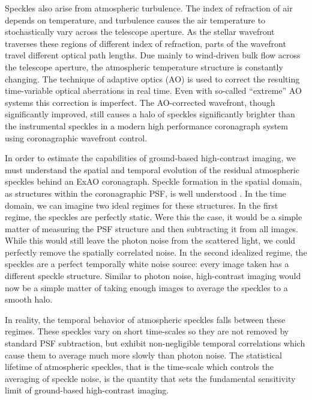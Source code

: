 \documentclass[10pt,preprint]{aastex631}
\begin{document}
Speckles also arise from atmospheric turbulence.  The index of refraction of air depends on temperature, and turbulence causes the air temperature to stochastically vary across the telescope aperture.  As the stellar wavefront traverses these regions of different index of refraction, parts of the wavefront travel different optical path lengths.  Due mainly to wind-driven bulk flow across the telescope aperture, the atmospheric temperature structure is constantly changing.  The technique of adaptive optics (AO) is used to correct the resulting time-variable optical aberrations in real time.  Even with so-called ``extreme'' AO systems \citep[ExAO, ][]{2018ARAA..56..315G} this correction is imperfect.  The AO-corrected wavefront, though significantly improved, still causes a halo of speckles significantly brighter than the instrumental speckles in a modern high performance coronagraph system using coronagraphic wavefront control.

In order to estimate the capabilities of ground-based high-contrast imaging, we must understand the spatial and temporal evolution of the residual atmospheric speckles behind an ExAO coronagraph.  Speckle formation in the spatial domain, as structures within the coronagraphic PSF, is well understood \citep{2001ApJ...558L..71B,2003ApJ...596..702P,2007ApJ...669..642S}.  In the time domain, we can imagine two ideal regimes for these structures.  In the first regime, the speckles are perfectly static.  Were this the case, it would be a simple matter of measuring the PSF structure and then subtracting it from all images.  While this would still leave the photon noise from the scattered light, we could perfectly remove the spatially correlated noise.  In the second idealized regime, the speckles are a perfect temporally white noise source: every image taken has a different speckle structure.  Similar to photon noise, high-contrast imaging would now be a simple matter of taking enough images to average the speckles to a smooth halo.

In reality, the temporal behavior of atmospheric speckles falls between these regimes. These speckles vary on short time-scales so they are not removed by standard PSF subtraction, but exhibit non-negligible temporal correlations which cause them to average much more slowly than photon noise.  The statistical lifetime of atmospheric speckles, that is the time-scale which controls the averaging of speckle noise, is the quantity that sets the fundamental sensitivity limit of ground-based high-contrast imaging.
\end{document}

